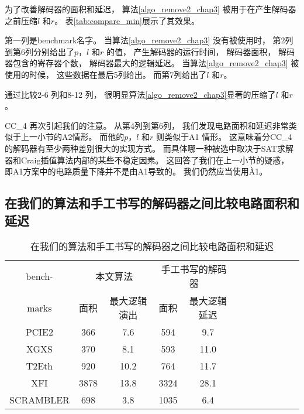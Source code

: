 为了改善解码器的面积和延迟，
算法\ref{algo_remove2_chap3} 被用于在产生解码器之前压缩$l$ 和$r$。
表\ref{tab:compare_min}展示了其效果。

第一列是benchmark名字。
当算法\ref{algo_remove2_chap3} 没有被使用时，
第2列到第6列分别给出了$p$，$l$ 和$r$ 的值，
产生解码器的运行时间，
解码器面积，
解码器包含的寄存器个数，
解码器最大的逻辑延迟。
当算法\ref{algo_remove2_chap3} 被使用的时候，
这些数据在最后5列给出。
而第7列给出了$l$ 和$r$。

通过比较2-6 列和8-12 列，
很明显算法\ref{algo_remove2_chap3}显著的压缩了$l$ 和$r$ 。

CC\_4 再次引起我们的注意。
从第4列到第6列，
我们发现电路面积和延迟非常类似于上一小节的A2情形。
而他的$p$，$l$ 和$r$ 则类似于A1 情形。
这意味着分CC\_4 的解码器有至少两种差别很大的实现方式。
而具体哪一种被选中取决于SAT求解器和Craig插值算法内部的某些不稳定因素。
这回答了我们在上一小节的疑惑，
即A1方案中的电路质量下降并不是由A1导致的。
我们仍然应当使用À1。


\subsection{在我们的算法和手工书写的解码器之间比较电路面积和延迟}\label{subsec_compareman}

\begin{table}[b]%
\caption{在我们的算法和手工书写的解码器之间比较电路面积和延迟}
\label{tab:comparing_hand}
\centering
\begin{tabular}{|c|c|c|c|c|c|c|c|c|c|c|c|}
\hline
bench-   & \multicolumn{2}{|c|}{本文算法} &  \multicolumn{2}{|c|}{手工书写的解码器} \\\cline{2-5}
marks    & 面积    & 最大逻辑演出       &面积    & 最大逻辑延迟\\\hline
PCIE2    & 366     &7.6                 & 594    & 9.7                              \\\hline
XGXS     & 370     &8.1                 & 593    & 11.0                             \\\hline
T2Eth    & 920     &10.2                & 764    & 11.7                             \\\hline
XFI      & 3878    & 13.8               & 3324   & 28.1                             \\\hline
SCRAMBLER& 698     & 3.8                & 1035   & 6.4                              \\\hline
\end{tabular}
\end{table}%

